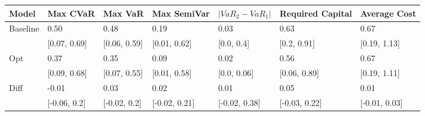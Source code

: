 \begin{tabular}{lllllll}
\toprule
   Model &     Max CVaR &      Max VaR &   Max SemiVar & $|VaR_2 - VaR_1|$ & Required Capital &  Average Cost \\
\midrule
Baseline &         0.50 &         0.48 &          0.19 &              0.03 &             0.63 &          0.67 \\
         & [0.07, 0.69] & [0.06, 0.59] &  [0.01, 0.62] &        [0.0, 0.4] &      [0.2, 0.91] &  [0.19, 1.13] \\
     Opt &         0.37 &         0.35 &          0.09 &              0.02 &             0.56 &          0.67 \\
         & [0.09, 0.68] & [0.07, 0.55] &  [0.01, 0.58] &       [0.0, 0.06] &     [0.06, 0.89] &  [0.19, 1.11] \\
    Diff &        -0.01 &         0.03 &          0.02 &              0.01 &             0.05 &          0.01 \\
         & [-0.06, 0.2] & [-0.02, 0.2] & [-0.02, 0.21] &     [-0.02, 0.38] &    [-0.03, 0.22] & [-0.01, 0.03] \\
\bottomrule
\end{tabular}
